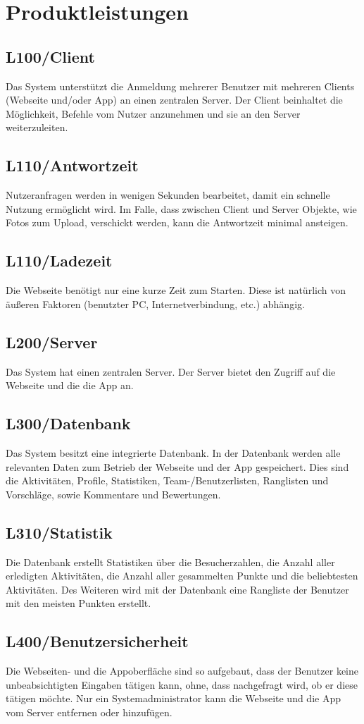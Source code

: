 \section{Produktleistungen}

\subsection{L100/Client} 
Das System unterstützt die Anmeldung mehrerer Benutzer mit mehreren Clients (Webseite und/oder App) an einen zentralen Server. Der Client beinhaltet die Möglichkeit, Befehle vom Nutzer anzunehmen und sie an den Server weiterzuleiten. 

\subsection{L110/Antwortzeit} 
Nutzeranfragen werden in wenigen Sekunden bearbeitet, damit ein schnelle Nutzung ermöglicht wird. Im Falle, dass zwischen Client und Server Objekte, wie Fotos zum Upload, verschickt werden, kann die Antwortzeit minimal ansteigen. 

\subsection{L110/Ladezeit} 
Die Webseite benötigt nur eine kurze Zeit zum Starten. Diese ist natürlich von äußeren Faktoren (benutzter PC, Internetverbindung, etc.) abhängig. 

\subsection{L200/Server} 
Das System hat einen zentralen Server. Der Server bietet den Zugriff auf die Webseite und die die App an. 

\subsection{L300/Datenbank} 
Das System besitzt eine integrierte Datenbank. In der Datenbank werden alle relevanten Daten zum Betrieb der Webseite und der App gespeichert. Dies sind die Aktivitäten, Profile, Statistiken, Team-/Benutzerlisten, Ranglisten und Vorschläge, sowie Kommentare und Bewertungen.

\subsection{L310/Statistik} 
Die Datenbank erstellt Statistiken über die Besucherzahlen, die Anzahl aller erledigten Aktivitäten, die Anzahl aller gesammelten Punkte und die beliebtesten Aktivitäten. Des Weiteren wird mit der Datenbank eine Rangliste der Benutzer mit den meisten Punkten erstellt.

\subsection{L400/Benutzersicherheit} 
Die Webseiten- und die Appoberfläche sind so aufgebaut, dass der Benutzer keine unbeabsichtigten Eingaben tätigen kann, ohne, dass nachgefragt wird, ob er diese tätigen möchte. Nur ein Systemadministrator kann die Webseite und die App vom Server entfernen oder hinzufügen.

